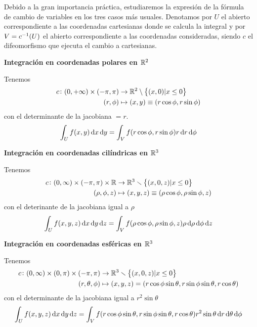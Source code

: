 \begin{obs}
    Debido a la gran importancia práctica, estudiaremos la expresión de la fórmula de cambio de variables en los tres casos más usuales.
    Denotamos por $U$ el abierto correspondiente a las coordenadas cartesianas donde se calcula la integral y por $V = c^{-1}(U)$ el
    abierto correspondiente a las coordenadas consideradas, siendo $c$ el difeomorfismo que ejecuta el cambio a cartesianas.

    \textbf{Integración en coordenadas polares en $\mathbb{R}^2$}
    
    Tenemos
    \[
        \begin{aligned}
            c \colon (0, +\infty) \times (-\pi, \pi) &\to \mathbb{R}^2 \setminus \left\{(x, 0) \vert x \leq 0\right\} \\
            (r, \phi) &\mapsto (x, y) \equiv (r \cos\phi, r \sin\phi)
        \end{aligned}
    \]
    con el determinante de la jacobiana $= r$.
    \[
        \int_U f(x,y) \dif x \dif y = \int_V f(r\cos\phi, r \sin\phi) r \dif r \dif \phi
    \]

    \textbf{Integración en coordenadas cilíndricas en $\mathbb{R}^3$}

    Tenemos
    \[
        \begin{aligned}
            c \colon (0, \infty) \times (-\pi, \pi) \times \mathbb{R} & \to \mathbb{R}^3 \smallsetminus \left\{(x, 0, z) \vert x \leq 0\right\}\\
            (\rho, \phi, z) &\mapsto (x, y, z) \equiv (\rho \cos \phi, \rho \sin \phi, z)
        \end{aligned}
    \]
    con el deterinante de la jacobiana igual a $\rho$
    \[
        \int_U f(x, y, z) \dif x \dif y \dif z = \int_V f( \rho \cos \phi, \rho \sin \phi, z) \rho \dif \rho \dif \phi \dif z
    \]

    \pagebreak                                  %
    
    \textbf{Integración en coordenadas esféricas en $\mathbb{R}^3$}

    Tenemos
    \[
        \begin{aligned}
            c \colon (0, \infty) \times (0, \pi) \times (-\pi, \pi) &\to \mathbb{R}^3 \smallsetminus \left\{(x, 0, z) \vert x \leq 0\right\} \\
            (r, \theta, \phi) &\mapsto (x, y, z) = (r\cos\phi\sin\theta, r\sin\phi\sin\theta, r\cos\theta)
        \end{aligned}
    \]
    con el determinante de la jacobiana igual a $r^2 \sin \theta$
    \[
        \int_U f(x, y, z) \dif x \dif y \dif z = \int_V f(r\cos\phi\sin\theta, r\sin\phi\sin\theta, r \cos \theta) r^2 \sin\theta
        \dif r \dif \theta \dif \phi
    \]
\end{obs}


